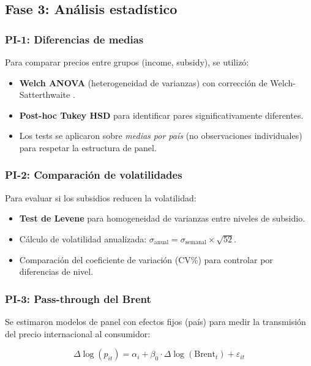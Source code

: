 \documentclass[stu, 12pt, a4paper, biblatex, donotrepeattitle]{apa7}
\begin{document}
\subsection{Fase 3: Análisis estadístico}

\subsubsection{PI-1: Diferencias de medias}

Para comparar precios entre grupos (income, subsidy), se utilizó:
\begin{itemize}
  \item \textbf{Welch ANOVA} (heterogeneidad de varianzas) con corrección de Welch-Satterthwaite \parencite{welch1947}.
  \item \textbf{Post-hoc Tukey HSD} para identificar pares significativamente diferentes.
  \item Los tests se aplicaron sobre \emph{medias por país} (no observaciones individuales) para respetar la estructura de panel.
\end{itemize}

\subsubsection{PI-2: Comparación de volatilidades}

Para evaluar si los subsidios reducen la volatilidad:
\begin{itemize}
  \item \textbf{Test de Levene} \parencite{levene1960} para homogeneidad de varianzas entre niveles de subsidio.
  \item Cálculo de volatilidad anualizada: $\sigma_{\text{anual}} = \sigma_{\text{semanal}} \times \sqrt{52}$.
  \item Comparación del coeficiente de variación (CV\%) para controlar por diferencias de nivel.
\end{itemize}

\subsubsection{PI-3: Pass-through del Brent}

Se estimaron modelos de panel con efectos fijos (país) para medir la transmisión del precio internacional al consumidor:

\begin{equation}
\Delta\log(p_{it}) = \alpha_i + \beta_0 \cdot \Delta\log(\text{Brent}_t) + \varepsilon_{it}
\end{equation}
\end{document}
